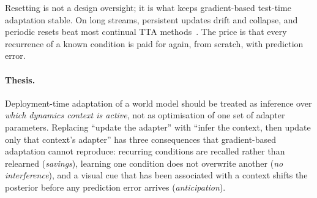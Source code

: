 \documentclass[10pt]{article}
\begin{document}
Resetting is not a design oversight; it is what keeps gradient-based test-time adaptation stable. On
long streams, persistent updates drift and collapse, and periodic resets beat most continual TTA
methods~\cite{press2023rdumb,hoang2024petta}. The price is that every recurrence of a known condition
is paid for again, from scratch, with prediction error.

\paragraph{Thesis.}
Deployment-time adaptation of a world model should be treated as inference over \emph{which
dynamics context is active}, not as optimisation of one set of adapter parameters. Replacing ``update
the adapter'' with ``infer the context, then update only that context's adapter'' has three
consequences that gradient-based adaptation cannot reproduce: recurring conditions are recalled rather
than relearned (\emph{savings}), learning one condition does not overwrite another (\emph{no
interference}), and a visual cue that has been associated with a context shifts the posterior before
any prediction error arrives (\emph{anticipation}).
\end{document}
